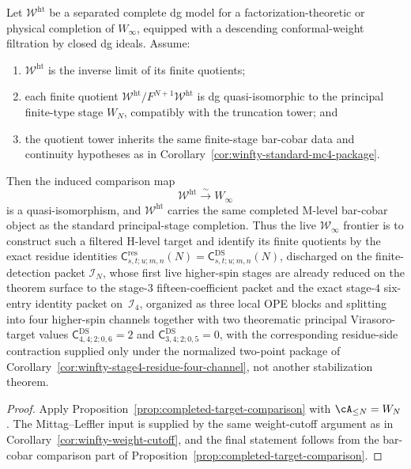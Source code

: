 \begin{corollary}
\label{cor:winfty-hlevel-comparison-criterion}
Let $\mathcal{W}^{\mathrm{ht}}$ be a separated complete dg model for a
factorization-theoretic or physical completion of $W_\infty$, equipped
with a descending conformal-weight filtration by closed dg ideals.
Assume:
\begin{enumerate}
\item $\mathcal{W}^{\mathrm{ht}}$ is the inverse limit of its finite quotients;
\item each finite quotient
  $\mathcal{W}^{\mathrm{ht}}/F^{N+1}\mathcal{W}^{\mathrm{ht}}$ is dg
  quasi-isomorphic to the principal finite-type stage $W_N$,
  compatibly with the truncation tower; and
\item the quotient tower inherits the same finite-stage bar-cobar data
  and continuity hypotheses as in
  Corollary~\ref{cor:winfty-standard-mc4-package}.
\end{enumerate}
Then the induced comparison map
\[
\mathcal{W}^{\mathrm{ht}} \xrightarrow{\sim} W_\infty
\]
is a quasi-isomorphism, and $\mathcal{W}^{\mathrm{ht}}$ carries the same
completed M-level bar-cobar object as the standard principal-stage
completion.  Thus the live $\mathcal{W}_\infty$ frontier is to
construct such a filtered H-level target and identify its finite
quotients by the exact residue identities
$\mathsf{C}^{\mathrm{res}}_{s,t;u;m,n}(N)
=\mathsf{C}^{\mathrm{DS}}_{s,t;u;m,n}(N)$,
discharged on the finite-detection packet $\mathcal{I}_N$, whose first
live higher-spin stages are already reduced on the theorem surface to
the stage-$3$ fifteen-coefficient packet and the exact stage-$4$
six-entry identity packet on~$\mathcal{I}_4$, organized as three local
OPE blocks and splitting into four higher-spin channels together with
two theorematic principal Virasoro-target values
$\mathsf{C}^{\mathrm{DS}}_{4,4;2;0,6}=2$ and
$\mathsf{C}^{\mathrm{DS}}_{3,4;2;0,5}=0$, with the corresponding
residue-side contraction supplied only under the normalized two-point
package of Corollary~\ref{cor:winfty-stage4-residue-four-channel}, not
another stabilization theorem.
\end{corollary}

\begin{proof}
Apply Proposition~\ref{prop:completed-target-comparison} with
$\cA_{\le N}=W_N$.  The Mittag--Leffler input is supplied by the same
weight-cutoff argument as in Corollary~\ref{cor:winfty-weight-cutoff},
and the final statement follows from the bar-cobar comparison part of
Proposition~\ref{prop:completed-target-comparison}.
\end{proof}

